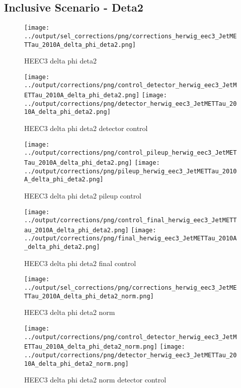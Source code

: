 \documentclass[11pt]{book}
\begin{document}
\clearpage
\subsection{Inclusive Scenario - Deta2}

\begin{figure}[ht]
\centering
\texttt{[image: ../output/sel\_corrections/png/corrections\_herwig\_eec3\_JetMETTau\_2010A\_delta\_phi\_deta2.png]}
\caption{HEEC3 delta phi deta2}
\label{fig:HEEC3_JetMETTau_2010A_delta_phi_deta2}
\end{figure}


\begin{figure}[ht]
\centering
\texttt{[image: ../output/corrections/png/control\_detector\_herwig\_eec3\_JetMETTau\_2010A\_delta\_phi\_deta2.png]}
\texttt{[image: ../output/corrections/png/detector\_herwig\_eec3\_JetMETTau\_2010A\_delta\_phi\_deta2.png]}
\caption{HEEC3 delta phi deta2 detector control}
\label{fig:HEEC3_JetMETTau_2010A_delta_phi_deta2_detector_control}
\end{figure}

\begin{figure}[ht]
\centering
\texttt{[image: ../output/corrections/png/control\_pileup\_herwig\_eec3\_JetMETTau\_2010A\_delta\_phi\_deta2.png]}
\texttt{[image: ../output/corrections/png/pileup\_herwig\_eec3\_JetMETTau\_2010A\_delta\_phi\_deta2.png]}
\caption{HEEC3 delta phi deta2 pileup control}
\label{fig:HEEC3_JetMETTau_2010A_delta_phi_deta2_pileup_control}
\end{figure}


\begin{figure}[ht]
\centering
\texttt{[image: ../output/corrections/png/control\_final\_herwig\_eec3\_JetMETTau\_2010A\_delta\_phi\_deta2.png]}
\texttt{[image: ../output/corrections/png/final\_herwig\_eec3\_JetMETTau\_2010A\_delta\_phi\_deta2.png]}
\caption{HEEC3 delta phi deta2 final control}
\label{fig:HEEC3_JetMETTau_2010A_delta_phi_deta2_final_control}
\end{figure}


\begin{figure}[ht]
\centering
\texttt{[image: ../output/sel\_corrections/png/corrections\_herwig\_eec3\_JetMETTau\_2010A\_delta\_phi\_deta2\_norm.png]}
\caption{HEEC3 delta phi deta2 norm}
\label{fig:HEEC3_JetMETTau_2010A_delta_phi_deta2_norm}
\end{figure}

\begin{figure}[ht]
\centering
\texttt{[image: ../output/corrections/png/control\_detector\_herwig\_eec3\_JetMETTau\_2010A\_delta\_phi\_deta2\_norm.png]}
\texttt{[image: ../output/corrections/png/detector\_herwig\_eec3\_JetMETTau\_2010A\_delta\_phi\_deta2\_norm.png]}
\caption{HEEC3 delta phi deta2 norm detector control}
\label{fig:HEEC3_JetMETTau_2010A_delta_phi_deta2_norm_detector_control}
\end{figure}
\end{document}
